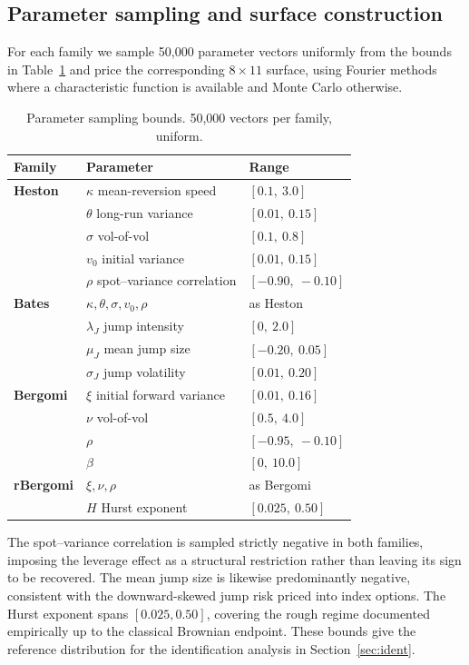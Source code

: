 \documentclass[11pt,a4paper]{article}
\begin{document}
\subsection{Parameter sampling and surface construction}
For each family we sample 50{,}000 parameter vectors uniformly from the bounds
in Table~\ref{tab:bounds} and price the corresponding $8\times11$ surface, using
Fourier methods where a characteristic function is available \citep{carr1999}
and Monte Carlo otherwise.

\begin{table}[h]
\centering
\caption{Parameter sampling bounds. 50{,}000 vectors per family, uniform.}
\label{tab:bounds}
\begin{tabular}{lll}
\toprule
Family & Parameter & Range \\
\midrule
\textbf{Heston} & $\kappa$ mean-reversion speed & $[0.1,\ 3.0]$ \\
 & $\theta$ long-run variance & $[0.01,\ 0.15]$ \\
 & $\sigma$ vol-of-vol & $[0.1,\ 0.8]$ \\
 & $v_0$ initial variance & $[0.01,\ 0.15]$ \\
 & $\rho$ spot--variance correlation & $[-0.90,\ -0.10]$ \\
\midrule
\textbf{Bates} & $\kappa,\theta,\sigma,v_0,\rho$ & as Heston \\
 & $\lambda_J$ jump intensity & $[0,\ 2.0]$ \\
 & $\mu_J$ mean jump size & $[-0.20,\ 0.05]$ \\
 & $\sigma_J$ jump volatility & $[0.01,\ 0.20]$ \\
\midrule
\textbf{Bergomi} & $\xi$ initial forward variance & $[0.01,\ 0.16]$ \\
 & $\nu$ vol-of-vol & $[0.5,\ 4.0]$ \\
 & $\rho$ & $[-0.95,\ -0.10]$ \\
 & $\beta$ & $[0,\ 10.0]$ \\
\midrule
\textbf{rBergomi} & $\xi,\nu,\rho$ & as Bergomi \\
 & $H$ Hurst exponent & $[0.025,\ 0.50]$ \\
\bottomrule
\end{tabular}
\end{table}

The spot--variance correlation is sampled strictly negative in both families,
imposing the leverage effect as a structural restriction rather than leaving its
sign to be recovered. The mean jump size is likewise predominantly negative,
consistent with the downward-skewed jump risk priced into index options. The
Hurst exponent spans $[0.025, 0.50]$, covering the rough regime documented
empirically \citep{gatheral2018} up to the classical Brownian endpoint. These
bounds give the reference distribution for the identification analysis in
Section~\ref{sec:ident}.
\end{document}

